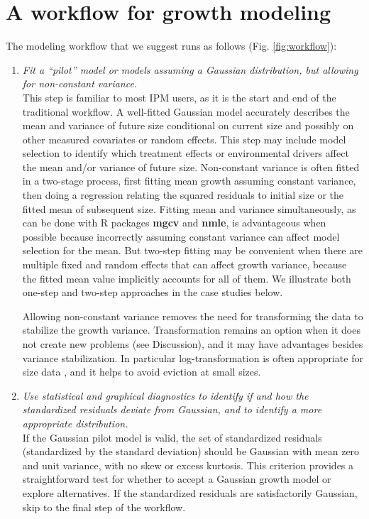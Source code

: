 \documentclass[12pt]{article}
\begin{document}
\section*{A workflow for growth modeling}
The modeling workflow that we suggest runs as follows (Fig. \ref{fig:workflow}):
\begin{enumerate}[label=\arabic*., listparindent=1.5em]
\item \textit{Fit a ``pilot'' model or models assuming a Gaussian distribution, but allowing for non-constant variance.}
\\ 
This step is familiar to most IPM users, as it is the start and end of the traditional workflow. 
A well-fitted Gaussian model accurately describes the mean and variance of future size conditional on current size and possibly on other measured covariates or random effects. 
This step may include model selection to identify which treatment effects or environmental drivers affect the mean and/or variance of future size. 
Non-constant variance is often fitted in a two-stage process, first fitting mean growth assuming constant variance, then doing a regression relating the squared residuals to initial size or the fitted mean of subsequent size. 
Fitting mean and variance simultaneously, as can be done with R packages \textbf{mgcv} and \textbf{nmle}, is advantageous when possible because incorrectly assuming constant variance can affect model selection for the mean. 
But two-step fitting may be convenient when there are multiple fixed and random effects that can affect growth variance, because the fitted mean value implicitly accounts for all of them. 
We illustrate both one-step and two-step approaches in the case studies below. 

Allowing non-constant variance removes the need for transforming the data to stabilize the growth variance. 
Transformation remains an option when it does not create new problems (see Discussion), and it may have advantages besides variance stabilization. %
In particular log-transformation is often appropriate for size data \citep{ellner-etal-2016}, and it helps to avoid eviction at small sizes. 

\item \textit{Use statistical and graphical diagnostics to identify if and how the standardized residuals deviate from Gaussian, and to identify a more appropriate distribution.}
\\
If the Gaussian pilot model is valid, the set of standardized residuals (standardized by the standard deviation) should be Gaussian with mean zero and unit variance, with no skew or excess kurtosis. 
This criterion provides a straightforward test for whether to accept a Gaussian growth model or explore alternatives. 
If the standardized residuals are satisfactorily Gaussian, skip to the final step of the workflow. 


\end{enumerate}
\end{document}
